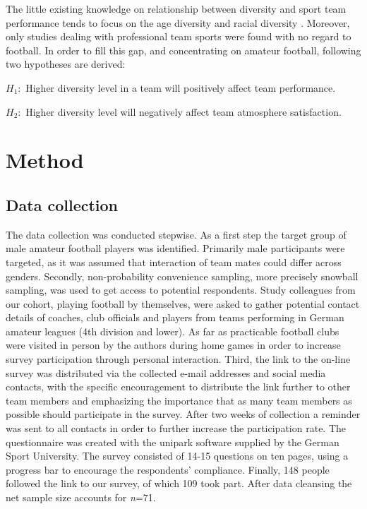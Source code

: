 \documentclass[	
	12pt, %
	a4paper, %
]{scrartcl}\usepackage[]{graphicx}\usepackage[]{color}
\begin{document}
The little existing knowledge on relationship between diversity and sport team performance tends to focus on the age diversity and racial diversity \cite{Pelled1999, Jehn1999, Waltemyer2006, Timmerman2000}. Moreover, only studies dealing with professional team sports were found with no regard to football. In order to fill this gap, and concentrating on amateur football, following two hypotheses are derived:


$ H_{1}: $ Higher diversity level in a team will positively affect team performance.

$ H_{2}: $ Higher diversity level will negatively affect team atmosphere satisfaction.


\section{Method}
\label{sec:method}
\subsection{Data collection}
The data collection was conducted stepwise. As a first step the target group of male amateur football players was identified. Primarily male participants were targeted, as it was assumed that interaction of team mates could differ across genders. Secondly, non-probability convenience sampling, more precisely snowball sampling, was used to get access to potential respondents. Study colleagues from our cohort, playing football by themselves, were asked to gather potential contact details of coaches, club officials and players from teams performing in German amateur leagues (4th division and lower). As far as practicable football clubs were visited in person by the authors during home games in order to increase survey participation through personal interaction. Third, the link to the on-line survey was distributed via the collected e-mail addresses and social media contacts, with the specific encouragement to distribute the link further to other team members and emphasizing the importance that as many team members as possible should participate in the survey. After two weeks of collection a reminder was sent to all contacts in order to further increase the participation rate. The questionnaire was created with the unipark software supplied by the German Sport University. The survey consisted of 14-15 questions on ten pages, using a progress bar to encourage the respondents' compliance. Finally, 148 people followed the link to our survey, of which 109 took part. After data cleansing the net sample size accounts for \textit{n}=71. 
\end{document}
